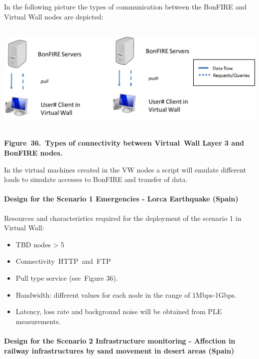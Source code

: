 \documentclass[a4paper]{article}
\newcommand\liststyleLFOxl{%
\renewcommand\labelitemi{[F0B7?]}
\renewcommand\labelitemii{o}
\renewcommand\labelitemiii{[F0A7?]}
\renewcommand\labelitemiv{[F0B7?]}
}
\begin{document}
In the following picture the types of communication between the BonFIRE
and Virtual Wall nodes are depicted:


\bigskip

{\centering 
\includegraphics[width=6.3044in,height=2.10023in]{out-img44.png} \par}

{\centering\bfseries
\label{bkm:Ref378773360}Figure\ 36.\ Types of connectivity between
Virtual\ Wall Layer 3 and BonFIRE nodes.
\par}


\bigskip

In the virtual machines created in the VW nodes a script will emulate
different loads to simulate accesses to BonFIRE and transfer of data.


\bigskip

\paragraph[Design for the Scenario 1 Emergencies {}- Lorca Earthquake
(Spain)]{Design for the Scenario 1 Emergencies - Lorca Earthquake
(Spain)}

\bigskip

Resources and characteristics required for the deployment of the
scenario 1 in Virtual Wall:\ 

\liststyleLFOxl
\begin{itemize}
\item TBD nodes {\textgreater} 5
\item Connectivity\ HTTP\ and\ FTP
\item Pull type service (see\ Figure 36).
\item Bandwidth: different values for each node in the range of
1Mbps-1Gbps.
\item Latency, loss rate and background noise will be obtained from PLE
measurements.
\end{itemize}
\paragraph[Design for the Scenario 2 Infrastructure monitoring {}-
Affection in railway infrastructures by sand movement in desert areas
(Spain)]{Design for the Scenario 2 Infrastructure monitoring -
Affection in railway infrastructures by sand movement in desert areas
(Spain)}
\end{document}

